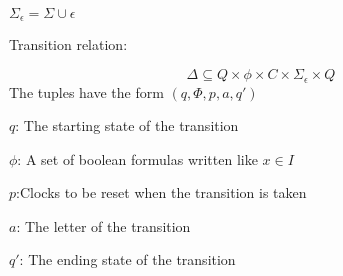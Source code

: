 $\Sigma_\epsilon=\Sigma\cup{\epsilon}$
\begin{definition}
    Transition relation:

    $$\Delta\subseteq Q\times\phi\times C\times\Sigma_\epsilon\times Q$$
The tuples have the form $(q,\Phi,p,a,q')$

$q$: The starting state of the transition

$\phi$: A set of boolean formulas written like $x\in I$

$p$:Clocks to be reset when the transition is taken

$a$: The letter of the transition

$q'$: The ending state of the transition
\end{definition}